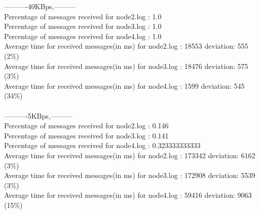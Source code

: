         ----------40KBps,---------\\
        Percentage of messages received for node2.log : 1.0\\
        Percentage of messages received for node3.log : 1.0\\
        Percentage of messages received for node4.log : 1.0\\
        Average time for received messages(in ms) for  node2.log : 18553 	deviation: 555 (2\%)\\
        Average time for received messages(in ms) for  node3.log : 18476 	deviation: 575 (3\%)\\
        Average time for received messages(in ms) for  node4.log : 1599 	deviation: 545 (34\%)\\\\
        ----------5KBps,---------\\
        Percentage of messages received for node2.log : 0.146\\
        Percentage of messages received for node3.log : 0.141\\
        Percentage of messages received for node4.log : 0.323333333333\\
        Average time for received messages(in ms) for  node2.log : 173342 	deviation: 6162 (3\%)\\
        Average time for received messages(in ms) for  node3.log : 172908 	deviation: 5539 (3\%)\\
        Average time for received messages(in ms) for  node4.log : 59416 	deviation: 9063 (15\%)\\\\
